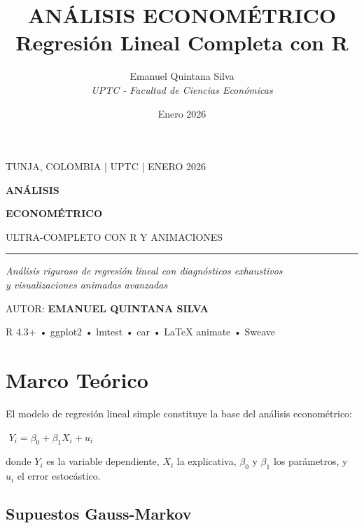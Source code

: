 \documentclass[10pt, spanish]{article}\usepackage[]{graphicx}\usepackage[]{xcolor}
\title{\techfont\Huge\bfseries ANÁLISIS ECONOMÉTRICO \\[8pt]
\Large\color{Champagne} Regresión Lineal Completa con R}
\author{\techfont Emanuel Quintana Silva \\
\small\textit{UPTC - Facultad de Ciencias Económicas}}
\date{\techfont\small Enero 2026}
\newcommand{\techfont}{\fontfamily{phv}\selectfont}
\newcommand{\eqbox}[1]{\colorbox{TitaniumGray}{\,\,$\displaystyle #1$\,\,}}
\begin{document}
\thispagestyle{empty}
\begin{center}
    \vspace*{1cm}
    {\techfont\footnotesize\color{InkGray} TUNJA, COLOMBIA | UPTC | ENERO 2026}

    \vspace{2cm}
    {\fontsize{48}{52}\selectfont\bfseries ANÁLISIS}

    {\fontsize{48}{52}\selectfont\bfseries ECONOMÉTRICO}

    \vspace{0.5cm}
    {\techfont\large\color{Champagne} ULTRA-COMPLETO CON R Y ANIMACIONES}

    \vspace{2cm}
    {\color{Champagne}\rule{3cm}{1pt}}

    \vspace{2cm}
    {\Large\itshape\color{InkGray}
    Análisis riguroso de regresión lineal con diagnósticos exhaustivos\\
    y visualizaciones animadas avanzadas}

    \vspace{2cm}
    {\techfont\small AUTOR: \textbf{EMANUEL QUINTANA SILVA}}

    \vspace{0.5cm}
    {\scriptsize\techfont\color{InkGray}
    R 4.3+ • ggplot2 • lmtest • car • LaTeX animate • Sweave}
\end{center}

\newpage


\section{Marco Teórico}

El modelo de regresión lineal simple constituye la base del análisis econométrico:

\vspace{8pt}
\begin{center}
\eqbox{Y_i = \beta_0 + \beta_1 X_i + u_i}
\end{center}
\vspace{8pt}

donde $Y_i$ es la variable dependiente, $X_i$ la explicativa, $\beta_0$ y $\beta_1$ los parámetros, y $u_i$ el error estocástico.

\subsection{Supuestos Gauss-Markov}
\end{document}
